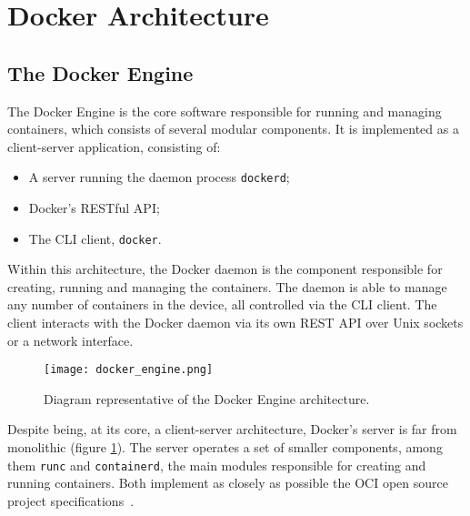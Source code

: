 \section{Docker Architecture}
\label{sec::arch}



\subsection{The Docker Engine}
\label{sec::arch:engine}
The Docker Engine is the core software responsible for running and managing containers, which consists of several modular components\cite{Docker-engine}. It is implemented as a client-server application, consisting of:

\begin{itemize}
    \item A server running the daemon process \texttt{dockerd};
    \item Docker's \acs{REST}ful \acs{API};
    \item The \acs{CLI} client, \texttt{docker}.
\end{itemize}

Within this architecture, the Docker daemon is the component responsible for creating, running and managing the containers. The daemon is able to manage any number of containers in the device, all controlled via the \acs{CLI} client. The client interacts with the Docker daemon via its own \acs{REST} \acs{API} over Unix sockets or a network interface\cite{Poulton2020-ju}.

\begin{figure}[!htb]
    \centering
    \texttt{[image: docker\_engine.png]}
    \caption{Diagram representative of the Docker Engine architecture\cite{fig-src:docker-engine}.}
    \label{fig::docker-engine-server}
\end{figure}

Despite being, at its core, a client-server architecture, Docker's server is far from monolithic (figure \ref{fig::docker-engine-server}). The server operates a set of smaller components, among them \texttt{runc} and \texttt{containerd}, the main modules responsible for creating and running containers. Both implement as closely as possible the \ac{OCI} open source project specifications~\cite{Poulton2020-ju, oci-runc, git-runc, docker-containerd}.

